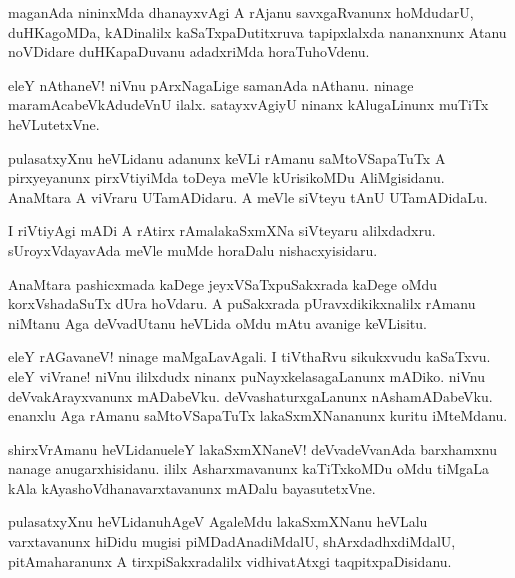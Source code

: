 \begin{mng}
maganAda nininxMda dhanayxvAgi A rAjanu savxgaRvanunx hoMdudarU, duHKagoMDa, kADinalilx kaSaTxpaDutitxruva tapipxlalxda nananxnunx Atanu noVDidare duHKapaDuvanu adadxriMda horaTuhoVdenu.
\end{mng}

\begin{mng}
eleY nAthaneV! niVnu pArxNagaLige samanAda nAthanu. ninage maramAcabeVkAdudeVnU ilalx. satayxvAgiyU ninanx kAlugaLinunx muTiTx heVLutetxVne.
\end{mng}

\begin{mng}
pulasatxyXnu heVLidanu adanunx keVLi rAmanu saMtoVSapaTuTx A pirxyeyanunx pirxVtiyiMda toDeya meVle kUrisikoMDu AliMgisidanu. AnaMtara A viVraru UTamADidaru. A meVle siVteyu tAnU UTamADidaLu.
\end{mng}

\begin{mng}
I riVtiyAgi mADi A rAtirx rAmalakaSxmXNa siVteyaru alilxdadxru. sUroyxVdayavAda meVle muMde horaDalu nishacxyisidaru.
\end{mng}

\begin{mng}
AnaMtara pashicxmada kaDege jeyxVSaTxpuSakxrada kaDege oMdu korxVshadaSuTx dUra hoVdaru. A puSakxrada pUravxdikikxnalilx rAmanu niMtanu Aga deVvadUtanu heVLida oMdu mAtu avanige keVLisitu.
\end{mng}

\begin{mng}
eleY rAGavaneV! ninage maMgaLavAgali. I tiVthaRvu sikukxvudu kaSaTxvu. eleY viVrane! niVnu ililxdudx ninanx puNayxkelasagaLanunx mADiko. niVnu deVvakArayxvanunx mADabeVku. deVvashaturxgaLanunx nAshamADabeVku. enanxlu Aga rAmanu saMtoVSapaTuTx lakaSxmXNananunx kuritu iMteMdanu.
\end{mng}

\begin{mng}
shirxVrAmanu heVLidanu\mdash eleY lakaSxmXNaneV! deVvadeVvanAda barxhamxnu nanage anugarxhisidanu. ililx Asharxmavanunx kaTiTxkoMDu oMdu tiMgaLa kAla kAyashoVdhanavarxtavanunx mADalu bayasutetxVne.
\end{mng}

\begin{mng}
pulasatxyXnu heVLidanu\mdash hAgeV AgaleMdu lakaSxmXNanu heVLalu varxtavanunx hiDidu mugisi piMDadAnadiMdalU, shArxdadhxdiMdalU, pitAmaharanunx A tirxpiSakxradalilx vidhivatAtxgi taqpitxpaDisidanu.
\end{mng}

